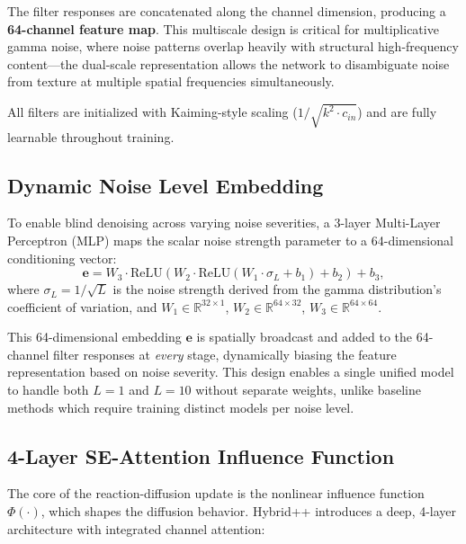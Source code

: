 \documentclass[conference]{IEEEtran}
\begin{document}
The filter responses are concatenated along the channel dimension, producing a \textbf{64-channel feature map}. This multiscale design is critical for multiplicative gamma noise, where noise patterns overlap heavily with structural high-frequency content---the dual-scale representation allows the network to disambiguate noise from texture at multiple spatial frequencies simultaneously.

All filters are initialized with Kaiming-style scaling ($1/\sqrt{k^2 \cdot c_{in}}$) and are fully learnable throughout training.

\subsection{Dynamic Noise Level Embedding}
To enable blind denoising across varying noise severities, a 3-layer Multi-Layer Perceptron (MLP) maps the scalar noise strength parameter to a 64-dimensional conditioning vector:
\begin{equation}
\mathbf{e} = W_3 \cdot \text{ReLU}(W_2 \cdot \text{ReLU}(W_1 \cdot \sigma_L + b_1) + b_2) + b_3,
\end{equation}
where $\sigma_L = 1/\sqrt{L}$ is the noise strength derived from the gamma distribution's coefficient of variation, and $W_1 \in \mathbb{R}^{32\times1}$, $W_2 \in \mathbb{R}^{64\times32}$, $W_3 \in \mathbb{R}^{64\times64}$.

This 64-dimensional embedding $\mathbf{e}$ is spatially broadcast and added to the 64-channel filter responses at \textit{every} stage, dynamically biasing the feature representation based on noise severity. This design enables a single unified model to handle both $L{=}1$ and $L{=}10$ without separate weights, unlike baseline methods which require training distinct models per noise level.

\subsection{4-Layer SE-Attention Influence Function}
The core of the reaction-diffusion update is the nonlinear influence function $\Phi(\cdot)$, which shapes the diffusion behavior. Hybrid++ introduces a deep, 4-layer architecture with integrated channel attention:
\end{document}
